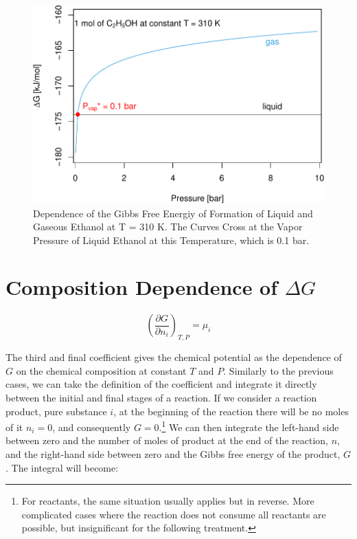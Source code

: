 \documentclass[
]{book}
\theoremstyle{definition}
\theoremstyle{definition}
\theoremstyle{definition}
\theoremstyle{remark}
\begin{document}
\begin{figure}

{\centering \includegraphics{pchem1_files/figure-latex/gdeppfig-1} 

}

\caption{Dependence of the Gibbs Free Energiy of Formation of Liquid and Gaseous Ethanol at T = 310 K. The Curves Cross at the Vapor Pressure of Liquid Ethanol at this Temperature, which is 0.1 bar.}\label{fig:gdeppfig}
\end{figure}

\hypertarget{composition-dependence-of-delta-g}{%
\section{\texorpdfstring{Composition Dependence of \(\Delta G\)}{Composition Dependence of \textbackslash Delta G}}\label{composition-dependence-of-delta-g}}

\[
\left(\frac{\partial G}{\partial n_i} \right)_{T,P}=\mu_i
\]

The third and final coefficient gives the chemical potential as the dependence of \(G\) on the chemical composition at constant \(T\) and \(P\). Similarly to the previous cases, we can take the definition of the coefficient and integrate it directly between the initial and final stages of a reaction. If we consider a reaction product, pure substance \(i\), at the beginning of the reaction there will be no moles of it \(n_i=0\), and consequently \(G=0\).\footnote{For reactants, the same situation usually applies but in reverse. More complicated cases where the reaction does not consume all reactants are possible, but insignificant for the following treatment.} We can then integrate the left-hand side between zero and the number of moles of product at the end of the reaction, \(n\), and the right-hand side between zero and the Gibbs free energy of the product, \(G\). The integral will become:
\end{document}
